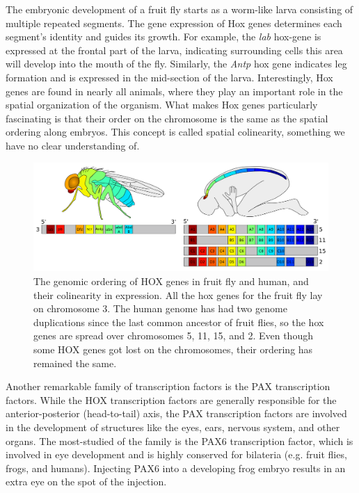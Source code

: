 The embryonic development of a fruit fly starts as a worm-like larva consisting of multiple repeated segments. The gene expression of Hox genes determines each segment's identity and guides its growth. For example, the \textit{lab} hox-gene is expressed at the frontal part of the larva, indicating surrounding cells this area will develop into the mouth of the fly\cite{Hughes2002}. Similarly, the \textit{Antp} hox gene indicates leg formation and is expressed in the mid-section of the larva. Interestingly, Hox genes are found in nearly all animals, where they play an important role in the spatial organization of the organism. What makes Hox genes particularly fascinating is that their order on the chromosome is the same as the spatial ordering along embryos. This concept is called spatial colinearity, something we have no clear understanding of\cite{Gaunt2015}.

\begin{figure}
    \center
    \includegraphics[width=\linewidth]{ch.introduction/imgs/hox.png}
    \caption{The genomic ordering of HOX genes in fruit fly and human, and their colinearity in expression. All the hox genes for the fruit fly lay on chromosome 3. The human genome has had two genome duplications since the last common ancestor of fruit flies, so the hox genes are spread over chromosomes 5, 11, 15, and 2. Even though some HOX genes got lost on the chromosomes, their ordering has remained the same.}
    \label{fig:hox}
\end{figure}

Another remarkable family of transcription factors is the PAX transcription factors. While the HOX transcription factors are generally responsible for the anterior-posterior (head-to-tail) axis, the PAX transcription factors are involved in the development of structures like the eyes, ears, nervous system, and other organs. The most-studied of the family is the PAX6 transcription factor, which is involved in eye development and is highly conserved for bilateria (e.g. fruit flies, frogs, and humans). Injecting PAX6 into a developing frog embryo results in an extra eye on the spot of the injection\cite{Chow1999}.

